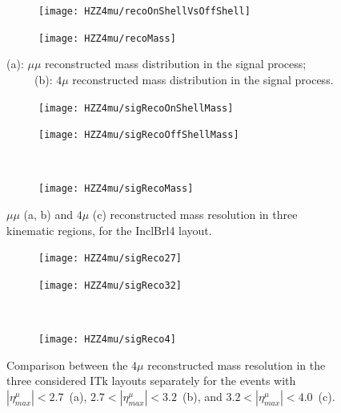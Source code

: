 \documentclass[a4paper,twoside,12pt]{book}
\begin{document}
\begin{figure}
\begin{subfigure}{.5\linewidth}
\texttt{[image: HZZ4mu/recoOnShellVsOffShell]}
\caption{}
\label{fig:HZZ4mu:recoOnShellVsOffShell}
\end{subfigure}
\begin{subfigure}{.5\linewidth}
\centering
\texttt{[image: HZZ4mu/recoMass]}
\caption{}
\label{fig:HZZ4mu:recoMass}
\end{subfigure}
\caption{(a): $\mu\mu$ reconstructed  mass distribution in the signal process;\\
\ \ \ \ \ (b): $4\mu$ reconstructed mass distribution in the signal process.}
\label{fig:HZZ4mu:recoMasses}
\end{figure}


\begin{figure}
\begin{subfigure}{.5\linewidth}
\texttt{[image: HZZ4mu/sigRecoOnShellMass]}
\caption{}
\label{fig:HZZ4mu:sigRecoOnShellMass}
\end{subfigure}
\begin{subfigure}{.5\linewidth}
\centering
\texttt{[image: HZZ4mu/sigRecoOffShellMass]}
\caption{}
\label{fig:HZZ4mu:sigRecoOffShell}
\end{subfigure}\\[1ex]
\begin{subfigure}{\linewidth}
\centering
\texttt{[image: HZZ4mu/sigRecoMass]}
\caption{}
\label{fig:HZZ4mu:sigRecoMass}
\end{subfigure}
\caption{$\mu\mu$ (a, b) and $4\mu$ (c) reconstructed  mass resolution in three kinematic regions, 
		for the InclBrl4 layout.}
\label{fig:HZZ4mu:massResolution}
\end{figure}

\begin{figure}
\begin{subfigure}{.5\linewidth}
\texttt{[image: HZZ4mu/sigReco27]}
\caption{}
\label{fig:HZZ4mu:sigReco27}
\end{subfigure}
\begin{subfigure}{.5\linewidth}
\centering
\texttt{[image: HZZ4mu/sigReco32]}
\caption{}
\label{fig:HZZ4mu:sigReco32}
\end{subfigure}\\[1ex]
\begin{subfigure}{\linewidth}
\centering
\texttt{[image: HZZ4mu/sigReco4]}
\caption{}
\label{fig:HZZ4mu:sigReco4}
\end{subfigure}
\caption{Comparison between the $4\mu$ reconstructed mass resolution in the
three considered ITk layouts separately for the events with \mbox{$|\eta^\mu_{max}| < 2.7$ (a)},
	\mbox{$2.7 < |\eta^\mu_{max}| < 3.2$ (b)}, and \mbox{$3.2 < |\eta^\mu_{max}| < 4.0$ (c)}.}
\label{fig:HZZ4mu:layoutMassResolution}
\end{figure}
\end{document}
